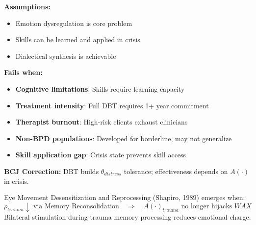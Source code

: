 \begin{tcolorbox}[colback=red!5!white, colframe=red!75!black, title=Boundary Condition: Where DBT Fails]
\textbf{Assumptions:}
\begin{itemize}[nosep]
\item Emotion dysregulation is core problem
\item Skills can be learned and applied in crisis
\item Dialectical synthesis is achievable
\end{itemize}

\textbf{Fails when:}
\begin{itemize}[nosep]
\item \textbf{Cognitive limitations}: Skills require learning capacity
\item \textbf{Treatment intensity}: Full DBT requires 1+ year commitment
\item \textbf{Therapist burnout}: High-risk clients exhaust clinicians
\item \textbf{Non-BPD populations}: Developed for borderline, may not generalize
\item \textbf{Skill application gap}: Crisis state prevents skill access
\end{itemize}

\textbf{BCJ Correction:} DBT builds $\theta_{distress}$ tolerance; effectiveness depends on $A(\cdot)$ in crisis.
\end{tcolorbox}


\begin{theorem}
\label{thm:emdr}
Eye Movement Desensitization and Reprocessing (Shapiro, 1989) emerges when:
\begin{equation}
\boxed{\rho_{trauma} \downarrow \text{ via Memory Reconsolidation} \quad \Rightarrow \quad A(\cdot)_{trauma} \text{ no longer hijacks } WAX}
\end{equation}
Bilateral stimulation during trauma memory processing reduces emotional charge.
\end{theorem}

